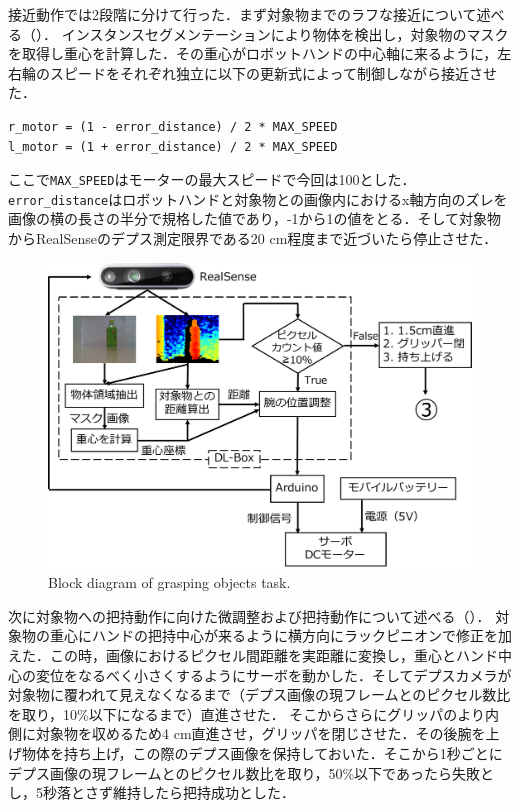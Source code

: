 接近動作では2段階に分けて行った．まず対象物までのラフな接近について述べる（）．
インスタンスセグメンテーションにより物体を検出し，対象物のマスクを取得し重心を計算した．その重心がロボットハンドの中心軸に来るように，左右輪のスピードをそれぞれ独立に以下の更新式によって制御しながら接近させた．
\begin{lstlisting}[caption=接近アルゴリズム, label=code:motor]
r_motor = (1 - error_distance) / 2 * MAX_SPEED
l_motor = (1 + error_distance) / 2 * MAX_SPEED
\end{lstlisting}
ここで\texttt{MAX\_SPEED}はモーターの最大スピードで今回は100とした．\texttt{error\_distance}はロボットハンドと対象物との画像内におけるx軸方向のズレを画像の横の長さの半分で規格した値であり，-1から1の値をとる．そして対象物からRealSenseのデプス測定限界である20 cm程度まで近づいたら停止させた．

\begin{figure}
    \centering
    \includegraphics[width=0.7\linewidth]{figure/chapter4/2号機制御図_把持-2}
    \caption{Block diagram of grasping objects task.}
    \label{fig:2号機把持}
\end{figure}

次に対象物への把持動作に向けた微調整および把持動作について述べる（）．
対象物の重心にハンドの把持中心が来るように横方向にラックピニオンで修正を加えた．この時，画像におけるピクセル間距離を実距離に変換し，重心とハンド中心の変位をなるべく小さくするようにサーボを動かした．そしてデプスカメラが対象物に覆われて見えなくなるまで（デプス画像の現フレームとのピクセル数比を取り，10\%以下になるまで）直進させた．
そこからさらにグリッパのより内側に対象物を収めるため4 cm直進させ，グリッパを閉じさせた．その後腕を上げ物体を持ち上げ，この際のデプス画像を保持しておいた．そこから1秒ごとにデプス画像の現フレームとのピクセル数比を取り，50\%以下であったら失敗とし，5秒落とさず維持したら把持成功とした．

